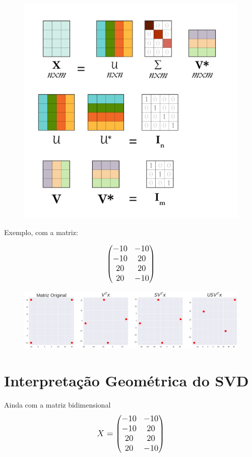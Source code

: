 \documentclass{article}
\begin{document}
\hfill

\begin{figure}[H]
\begin{center}
  \includegraphics[width=0.4\linewidth]{images/algelin1.png}
\end{center}
\end{figure}

\hfill

Exemplo, com a matriz:

\begin{equation}
    \mathlarger{
    \begin{pmatrix}
    -10 & -10 \\
    -10 & 20 \\
    20 & 20 \\
    20 & -10 
    \end{pmatrix}
    }
\end{equation}
\begin{figure}[H]
\begin{center}
  \includegraphics[width=0.6\linewidth]{images/svd_plots.png}
\end{center}
\end{figure}


\pagebreak

\section{Interpretação Geométrica do SVD}

\hfill

Ainda com a matriz bidimensional
\begin{equation}
    \mathlarger{
    X = \begin{pmatrix}
    -10 & -10 \\
    -10 & 20 \\
    20 & 20 \\
    20 & -10 
    \end{pmatrix}
    }
\end{equation}
\end{document}
